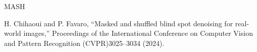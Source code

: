 MASH

H. Chihaoui and P. Favaro, “Masked and shuffled blind spot denoising for real-world images,” Proceedings of the International Conference on Computer Vision and Pattern Recognition (CVPR)3025–3034 (2024).


